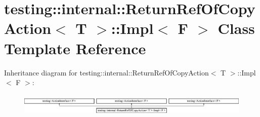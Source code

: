 \hypertarget{classtesting_1_1internal_1_1_return_ref_of_copy_action_1_1_impl}{}\section{testing\+::internal\+::Return\+Ref\+Of\+Copy\+Action$<$ T $>$\+::Impl$<$ F $>$ Class Template Reference}
\label{classtesting_1_1internal_1_1_return_ref_of_copy_action_1_1_impl}
Inheritance diagram for testing\+::internal\+::Return\+Ref\+Of\+Copy\+Action$<$ T $>$\+::Impl$<$ F $>$\+:\begin{figure}[H]
\begin{center}
\leavevmode
\includegraphics[height=1.107814cm]{d7/dc6/classtesting_1_1internal_1_1_return_ref_of_copy_action_1_1_impl}
\end{center}
\end{figure}
